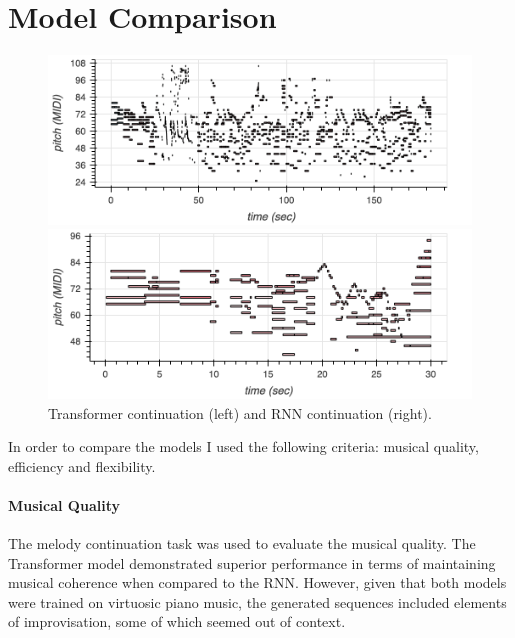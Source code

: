 \documentclass[twocolumn]{article}
\begin{document}
\section{Model Comparison}
\begin{figure}[htbp]
  \centering
  \begin{minipage}[t]{0.45\columnwidth}
    \centering
    \includegraphics[width=\linewidth]{images/tf_continuation.png}
  \end{minipage}\hfill
  \begin{minipage}[t]{0.45\columnwidth}
    \centering
    \includegraphics[width=\linewidth]{images/rnn_continuation.png}
  \end{minipage}
  \caption{Transformer continuation (left) and RNN continuation (right).}
  \label{fig:groupedImages3}
\end{figure}
In order to compare the models I used the following criteria: musical quality, efficiency and flexibility.
\paragraph{Musical Quality}  The melody continuation task was used to evaluate the musical quality. The Transformer model demonstrated superior performance in terms of maintaining musical coherence when compared to the RNN. However, given that both models were trained on virtuosic piano music, the generated sequences included elements of improvisation, some of which seemed out of context.
\end{document}

